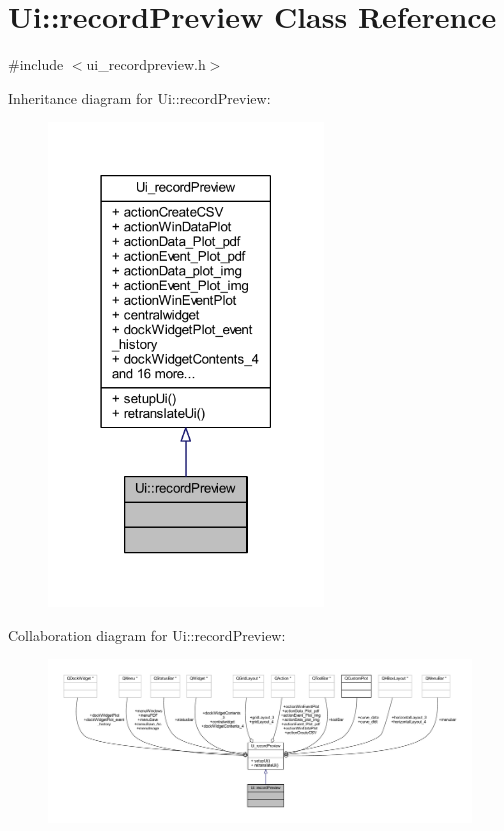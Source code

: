 \hypertarget{a00074}{\section{Ui\+:\+:record\+Preview Class Reference}
\label{a00074}
}


{\ttfamily \#include $<$ui\+\_\+recordpreview.\+h$>$}



Inheritance diagram for Ui\+:\+:record\+Preview\+:
\nopagebreak
\begin{figure}[H]
\begin{center}
\leavevmode
\includegraphics[width=207pt]{d9/d07/a00607}
\end{center}
\end{figure}


Collaboration diagram for Ui\+:\+:record\+Preview\+:
\nopagebreak
\begin{figure}[H]
\begin{center}
\leavevmode
\includegraphics[width=350pt]{d4/d14/a00608}
\end{center}
\end{figure}
